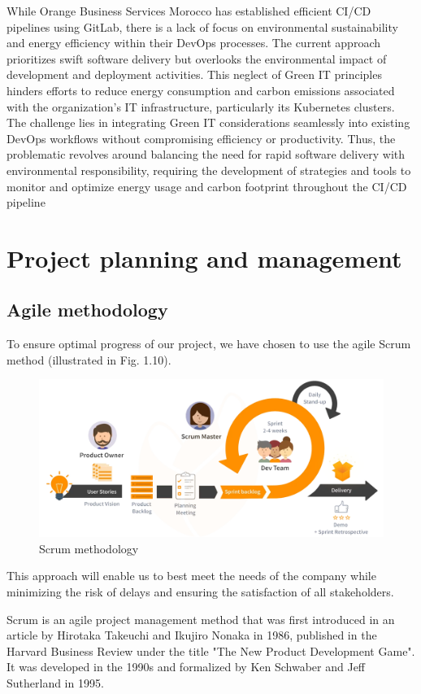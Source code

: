 While Orange Business Services Morocco has established efficient CI/CD pipelines using GitLab, there is a lack of focus on environmental sustainability and energy efficiency within their DevOps processes. The current approach prioritizes swift software delivery but overlooks the environmental impact of development and deployment activities. This neglect of Green IT principles hinders efforts to reduce energy consumption and carbon emissions associated with the organization's IT infrastructure, particularly its Kubernetes clusters. The challenge lies in integrating Green IT considerations seamlessly into existing DevOps workflows without compromising efficiency or productivity. Thus, the problematic revolves around balancing the need for rapid software delivery with environmental responsibility, requiring the development of strategies and tools to monitor and optimize energy usage and carbon footprint throughout the CI/CD pipeline
\section{Project planning and management}
\subsection{Agile methodology}

To ensure optimal progress of our project, we have chosen to use the agile Scrum method (illustrated in Fig. 1.10).

\begin{figure}[H]
  \centering
  \includegraphics[width=17.5cm]{Figures/scrum.png}
  \caption{Scrum methodology}
\end{figure}

This approach will enable us to best meet the needs of the company while minimizing the risk of delays and ensuring the satisfaction of all stakeholders.

Scrum is an agile project management method that was first introduced in an article by Hirotaka Takeuchi and Ikujiro Nonaka in 1986, published in the Harvard Business Review under the title "The New Product Development Game". It was developed in the 1990s and formalized by Ken Schwaber and Jeff Sutherland in 1995.

